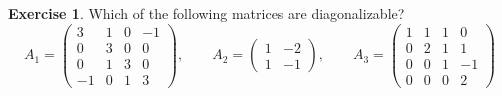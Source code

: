 \documentclass[12pt]{article}
\theoremstyle{definition}
\newtheorem{exercise}{Exercise}
\begin{document}
\begin{exercise}\label{r7-ex-which-diagonalizable}
Which of the following matrices are diagonalizable?
\[
A_1=\begin{pmatrix}3&1&0&-1\\0&3&0&0\\0&1&3&0\\-1&0&1&3\end{pmatrix},\qquad
A_2=\begin{pmatrix}1&-2\\1&-1\end{pmatrix},\qquad
A_3=\begin{pmatrix}1&1&1&0\\0&2&1&1\\0&0&1&-1\\0&0&0&2\end{pmatrix}
\]
\end{exercise}
\end{document}
